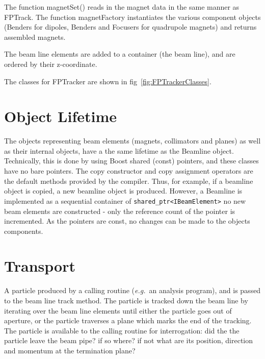 \documentclass[a4paper,12pt]{article}
\newcommand{\eg}{{\it e.g.}}
\begin{document}
The function magnetSet() reads in the magnet data in the same manner as
FPTrack. The function magnetFactory instantiates the various component 
objects (Benders for dipoles, Benders and Focusers for quadrupole magnets) and
returns assembled magnets.

The beam line elements are added to a container (the beam line), and are ordered
by their z-coordinate.

The classes for FPTracker are shown in fig~\ref{fig:FPTrackerClasses}.
\begin{figure}
  \begin{center}
  \end{center} 
\end{figure}

\section{Object Lifetime}
The objects representing beam elements (magnets, collimators and planes) as well as their
internal objects, have a the same lifetime as the Beamline object. Technically, this is
done by using Boost shared (const) pointers, and these classes have no bare pointers. The copy constructor
and copy assignment operators are the default methods provided by the compiler.
Thus, for example, if a beamline object is copied, a new beamline object is produced. However,
a Beamline is implemented as a sequential container of \verb+shared_ptr<IBeamElement>+ no new 
beam elements are constructed - only the reference count of the pointer is incremented.
As the pointers are const, no changes can be made to the objects components.    

\section{Transport}
A particle produced by a calling routine (\eg\ an analysis program),
and is passed to the beam line track method. The particle is tracked down
the beam line by iterating over the beam line elements until either the 
particle goes out of aperture, or the particle traverses a plane which marks the
end of the tracking. The particle is available to the calling routine for
interrogation: did the the particle leave the beam pipe? if so where? if not
what are its position, direction and momentum at the termination plane?
\end{document}
